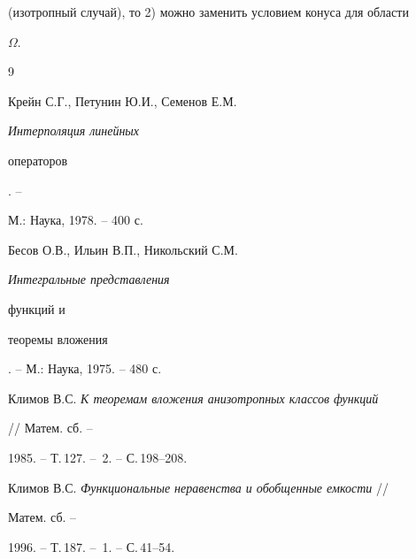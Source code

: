 (изотропный случай), то 2) можно заменить условием конуса для области 


$\Omega$. 


 


\begin{thebibliography}{9} 


 




Крейн С.Г., Петунин Ю.И., Семенов Е.М. {\em Интерполяция линейных 


операторов}. -- 


М.: Наука, 1978. -- 400 с. 




Бесов О.В., Ильин В.П., Никольский С.М. {\em Интегральные представления 


функций и 


теоремы вложения}. -- М.: Наука, 1975. -- 480 с. 




Климов В.С. {\em К теоремам вложения анизотропных классов функций} 


// Матем. сб. -- 


1985. -- Т.\,127. -- \No\,2. -- С.\,198--208. 


\bibitem{} 


Климов В.С. {\em Функциональные неравенства и обобщенные емкости} // 


Матем. сб. -- 


1996. -- Т.\,187. -- \No\,1. -- С.\,41--54. 


 


 


\end{thebibliography} 


 


\vskip 2cm 


 








 


\label{end} 


 


